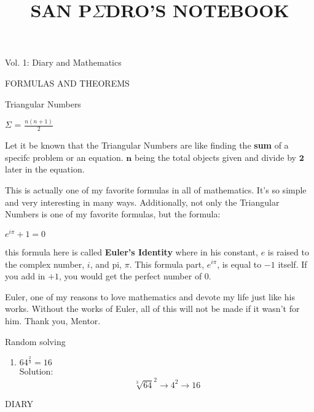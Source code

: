 \documentclass{article}
\title{\vspace*{\fill} \Huge\begin{center}SAN P$\Sigma$DRO'S NOTEBOOK\end{center} \vspace*{\fill}}
\date{}
\begin{document}
\maketitle
\vspace*{\fill}
\begin{center}
    \huge Vol. 1: Diary and Mathematics
\end{center}
\vspace*{\fill}
\newpage
\vspace*{\fill}
\begin{center}
    \Huge FORMULAS AND THEOREMS
\end{center}
\vspace*{\fill}
\newpage
\begin{center}
    \Huge
    Triangular Numbers
\vspace{1em}

    $\Sigma$ = $\frac{n(n+1)}{2}$
\end{center} \vspace{1em}
\Large
Let it be known that the Triangular Numbers are like finding the \textbf{sum} of a specifc
problem or an equation. $\textbf{n}$ being the total objects given and divide by $\textbf{2}$
later in the equation. \\
\vspace{1em}

This is actually one of my favorite formulas in all of mathematics.
It's so simple and very interesting in many ways. Additionally, not only
the Triangular Numbers is one of my favorite formulas, but the formula:
\vspace{1em}
\begin{center}
    \Huge
    $e^{i\pi} + 1 =0$ 
\end{center} \vspace{1em}
this formula here is called \textbf{Euler's Identity} where in his constant, $e$ is raised
to the complex number, $i$, and pi, $\pi$. This formula part, $e^{i\pi}$,
is equal to $-1$ itself. If you add in $+1$, you would get the perfect number of $0$.
\vspace{1em}

Euler, one of my reasons to love mathematics and devote my life just like his works.
Without the works of Euler, all of this will not be made if it wasn't for 
him. Thank you, Mentor.

\newpage
\vspace*{\fill}
\begin{center}
    \Huge Random solving
\end{center}
\vspace*{\fill}
\newpage
\newpage
\begin{enumerate}
    \item $64^{\frac{2}{3}} = 16$\\
    Solution:
    \vspace{1em}
    \begin{equation*}
        \sqrt[3]{64}^2 \rightarrow 4^2 \rightarrow \boxed{16}
    \end{equation*}
\end{enumerate}

\newpage %
\vspace*{\fill}
\begin{center}
    \Huge DIARY
\end{center}
\vspace*{\fill}
\end{document}
